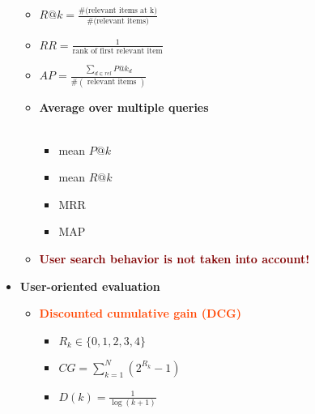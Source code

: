 \begin{itemize}
\begin{itemize}
        \item{ $R@k = \frac{\text{\#(relevant items at k)}}{\text{\#(relevant items)}}$}
        \item{\makebox[6cm]{\textbf{\textcolor{Violet}{Reciprocal rank (RR)}}\hfill} $RR = \frac{1}{\text{rank of first relevant item}}$}
        \item{\makebox[6cm]{\textbf{\textcolor{Cerulean}{Average precision (AP)}}\hfill} $A P=\frac{\sum_{d \in r e l} P @ k_{d}}{\#(\text { relevant items })}$}
        \item \textbf{Average over multiple queries} \\
        \\
        \begin{minipage}{.2\textwidth}
        \begin{itemize}
            \setlength\itemsep{0em}
            \item mean $P@k$
            \item mean $R@k$
        \end{itemize}
        \end{minipage}
        \begin{minipage}{.2\textwidth}
        \begin{itemize}
            \setlength\itemsep{0em}
            \item MRR
            \item MAP
        \end{itemize}
        \end{minipage}
        \vspace{0.2cm}
        \item \textbf{\textcolor{Maroon}{User search behavior is not taken into account!}}
    \end{itemize}
    \vspace{0.2cm}
    \item \textbf{User-oriented evaluation}
    \begin{itemize}
        \item \textbf{\textcolor{OrangeRed}{Discounted cumulative gain (DCG)}}
        \begin{itemize}
            \item{ $R_k \in \{0,1,2,3,4\}$}
            \item{\makebox[6cm]{\textcolor{OrangeRed}{Cumulative Gain}:\hfill} $CG = \sum^N_{k=1}(2^{R_k} - 1)$}
            \item{ $D(k) = \frac{1}{\log(k+1)}$}

\end{itemize}
\end{itemize}
\end{itemize}
